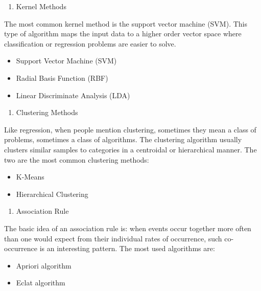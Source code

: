 \documentclass[12pt,]{krantz}
\providecommand{\tightlist}{%
  \setlength{\itemsep}{0pt}\setlength{\parskip}{0pt}}
\theoremstyle{definition}
\theoremstyle{definition}
\theoremstyle{remark}
\begin{document}
\begin{enumerate}
\def\labelenumi{\arabic{enumi}.}
\setcounter{enumi}{6}
\tightlist
\item
  Kernel Methods
\end{enumerate}

The most common kernel method is the support vector machine (SVM). This
type of algorithm maps the input data to a higher order vector space
where classification or regression problems are easier to solve.

\begin{itemize}
\tightlist
\item
  Support Vector Machine (SVM)
\item
  Radial Basis Function (RBF)
\item
  Linear Discriminate Analysis (LDA)
\end{itemize}

\begin{enumerate}
\def\labelenumi{\arabic{enumi}.}
\setcounter{enumi}{7}
\tightlist
\item
  Clustering Methods
\end{enumerate}

Like regression, when people mention clustering, sometimes they mean a
class of problems, sometimes a class of algorithms. The clustering
algorithm usually clusters similar samples to categories in a centroidal
or hierarchical manner. The two are the most common clustering methods:

\begin{itemize}
\tightlist
\item
  K-Means
\item
  Hierarchical Clustering
\end{itemize}

\begin{enumerate}
\def\labelenumi{\arabic{enumi}.}
\setcounter{enumi}{8}
\tightlist
\item
  Association Rule
\end{enumerate}

The basic idea of an association rule is: when events occur together
more often than one would expect from their individual rates of
occurrence, such co- occurrence is an interesting pattern. The most used
algorithms are:

\begin{itemize}
\tightlist
\item
  Apriori algorithm
\item
  Eclat algorithm
\end{itemize}
\end{document}
